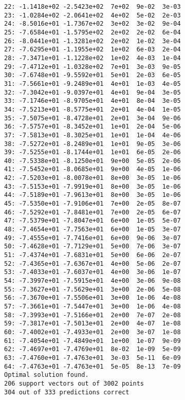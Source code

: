 \documentclass[11pt]{article}
\begin{document}
\begin{Verbatim}[commandchars=\\\{\}]
22: -1.1418e+02 -2.5423e+02  7e+02  9e-02  3e-03
23: -1.0284e+02 -2.0641e+02  4e+02  5e-02  2e-03
24: -8.5016e+01 -1.7367e+02  3e+02  3e-02  9e-04
25: -7.6584e+01 -1.5795e+02  2e+02  2e-02  6e-04
26: -8.0441e+01 -1.3281e+02  2e+02  1e-02  3e-04
27: -7.6295e+01 -1.1955e+02  1e+02  6e-03  2e-04
28: -7.3471e+01 -1.1228e+02  1e+02  4e-03  1e-04
29: -7.4712e+01 -1.0328e+02  7e+01  3e-03  9e-05
30: -7.6748e+01 -9.5592e+01  5e+01  2e-03  6e-05
31: -7.5661e+01 -9.2489e+01  4e+01  1e-03  4e-05
32: -7.3042e+01 -9.0397e+01  4e+01  9e-04  3e-05
33: -7.1746e+01 -8.9705e+01  4e+01  8e-04  3e-05
34: -7.5213e+01 -8.5775e+01  2e+01  4e-04  1e-05
35: -7.5075e+01 -8.4728e+01  2e+01  3e-04  9e-06
36: -7.5757e+01 -8.3452e+01  1e+01  2e-04  5e-06
37: -7.5813e+01 -8.3025e+01  1e+01  1e-04  4e-06
38: -7.5272e+01 -8.2489e+01  1e+01  9e-05  3e-06
39: -7.5255e+01 -8.1744e+01  1e+01  6e-05  2e-06
40: -7.5338e+01 -8.1250e+01  9e+00  5e-05  2e-06
41: -7.5452e+01 -8.0685e+01  9e+00  4e-05  1e-06
42: -7.5203e+01 -8.0078e+01  8e+00  3e-05  1e-06
43: -7.5153e+01 -7.9919e+01  8e+00  3e-05  1e-06
44: -7.5189e+01 -7.9613e+01  8e+00  3e-05  1e-06
45: -7.5350e+01 -7.9106e+01  7e+00  2e-05  8e-07
46: -7.5292e+01 -7.8481e+01  7e+00  2e-05  6e-07
47: -7.5379e+01 -7.8047e+01  6e+00  1e-05  5e-07
48: -7.4654e+01 -7.7563e+01  6e+00  1e-05  3e-07
49: -7.4555e+01 -7.7416e+01  6e+00  9e-06  3e-07
50: -7.4628e+01 -7.7129e+01  5e+00  7e-06  3e-07
51: -7.4374e+01 -7.6831e+01  5e+00  6e-06  2e-07
52: -7.4365e+01 -7.6367e+01  4e+00  5e-06  2e-07
53: -7.4033e+01 -7.6037e+01  4e+00  3e-06  1e-07
54: -7.3997e+01 -7.5915e+01  4e+00  3e-06  9e-08
55: -7.3627e+01 -7.5629e+01  3e+00  2e-06  5e-08
56: -7.3670e+01 -7.5506e+01  3e+00  1e-06  4e-08
57: -7.3661e+01 -7.5447e+01  3e+00  1e-06  4e-08
58: -7.3993e+01 -7.5166e+01  2e+00  7e-07  2e-08
59: -7.3817e+01 -7.5013e+01  2e+00  4e-07  1e-08
60: -7.4002e+01 -7.4933e+01  2e+00  3e-07  1e-08
61: -7.4054e+01 -7.4849e+01  1e+00  1e-07  9e-09
62: -7.4697e+01 -7.4769e+01  8e-02  1e-09  5e-09
63: -7.4760e+01 -7.4763e+01  3e-03  5e-11  6e-09
64: -7.4763e+01 -7.4763e+01  5e-05  8e-13  7e-09
Optimal solution found.
206 support vectors out of 3002 points
304 out of 333 predictions correct

    \end{Verbatim}
\end{document}
